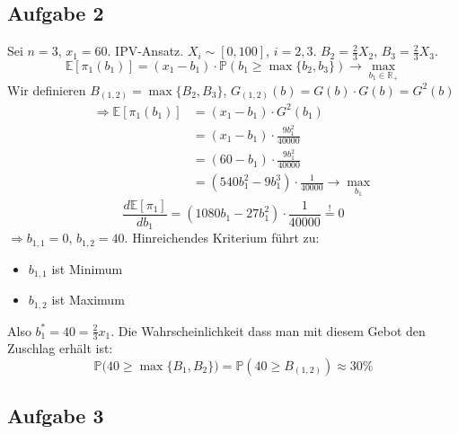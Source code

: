 \documentclass[12pt]{extreport} %
\newcommand{\R}{\mathbb{R}}
\theoremstyle{named}
\theoremstyle{itshape}
\theoremstyle{normal}
\begin{document}
\subsection*{Aufgabe 2}

Sei $n = 3$, $x_1 = 60$. IPV-Ansatz. $X_i \sim [0, 100]$, $i = 2,3$. $B_2 = \frac{2}{3} X_2$, $B_3 = \frac{2}{3} X_3$.
$$ \mathds{E} \left[ \pi_1(b_1) \right] = \left( x_1 - b_1 \right) \cdot \mathds{P} \left( b_1 \geq \max \{ b_2, b_3 \} \right) \rightarrow \max_{b_1 \in \R_+} $$
Wir definieren $B_{(1,2)} = \max \{ B_2, B_3 \}$, $G_{(1,2)}(b) = G(b) \cdot G(b) = G^{2}(b)$
\begin{align*}
	\Rightarrow \mathds{E} \left[ \pi_1(b_1) \right] & = (x_1 - b_1) \cdot G^{2}(b_1) \\
				& = (x_1 - b_1) \cdot \frac{9 b_1^2}{40000} \\
				& = (60 - b_1) \cdot \frac{9 b_1^2}{40000} \\
				& = \left( 540 b_1^2 - 9 b_1^3 \right) \cdot \frac{
				1}{40000} \rightarrow \max_{b_1}
\end{align*}
$$ \frac{d \mathds{E}[\pi_1]}{d b_1} = \left( 1080 b_1 - 27 b_1^2 \right) \cdot \frac{1}{40000} \overset{!}{=} 0 $$
$\Rightarrow b_{1,1} = 0$, $b_{1,2} = 40$. Hinreichendes Kriterium führt zu: 
\begin{itemize}
	\item $b_{1,1}$ ist Minimum
	\item $b_{1,2}$ ist Maximum
\end{itemize}
Also $b_1^* = 40 = \frac{2}{3} x_1$. Die Wahrscheinlichkeit dass man mit diesem Gebot den Zuschlag erhält ist:
$$ \mathds{P} \big( 40 \geq \max \{ B_1, B_2 \} \big) = \mathds{P} \left( 40 \geq B_{(1,2)} \right) \approx 30 \% $$

\subsection*{Aufgabe 3}
\end{document}
